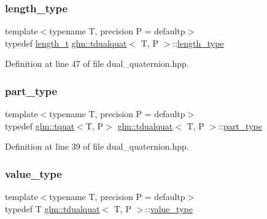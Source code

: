 \subsubsection{\texorpdfstring{length\_type}{length\_type}}
{\footnotesize\ttfamily template$<$typename T, precision P = defaultp$>$ \\
typedef \mbox{\hyperlink{namespaceglm_a090a0de2260835bee80e71a702492ed9}{length\+\_\+t}} \mbox{\hyperlink{structglm_1_1tdualquat}{glm\+::tdualquat}}$<$ T, P $>$\+::\mbox{\hyperlink{structglm_1_1tdualquat_a8100706ca94a1aa6611874787a9be0ca}{length\+\_\+type}}}



Definition at line 47 of file dual\+\_\+quaternion.\+hpp.

\mbox{\label{structglm_1_1tdualquat_a496a3e08262a28863cf7b0609eee7e5b}} 
\subsubsection{\texorpdfstring{part\_type}{part\_type}}
{\footnotesize\ttfamily template$<$typename T, precision P = defaultp$>$ \\
typedef \mbox{\hyperlink{structglm_1_1tquat}{glm\+::tquat}}$<$T, P$>$ \mbox{\hyperlink{structglm_1_1tdualquat}{glm\+::tdualquat}}$<$ T, P $>$\+::\mbox{\hyperlink{structglm_1_1tdualquat_a496a3e08262a28863cf7b0609eee7e5b}{part\+\_\+type}}}



Definition at line 39 of file dual\+\_\+quaternion.\+hpp.

\mbox{\label{structglm_1_1tdualquat_afcff3aadbc6e5c5672e2af653a5e401c}} 
\subsubsection{\texorpdfstring{value\_type}{value\_type}}
{\footnotesize\ttfamily template$<$typename T, precision P = defaultp$>$ \\
typedef T \mbox{\hyperlink{structglm_1_1tdualquat}{glm\+::tdualquat}}$<$ T, P $>$\+::\mbox{\hyperlink{structglm_1_1tdualquat_afcff3aadbc6e5c5672e2af653a5e401c}{value\+\_\+type}}}



